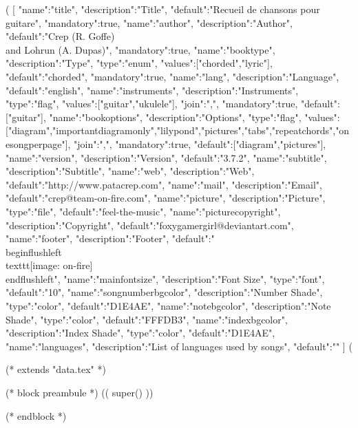 %
%
%

(%
[
{"name":"title", "description":"Title", "default":"Recueil de chansons pour guitare", "mandatory":true},
{"name":"author", "description":"Author", "default":"Crep (R. Goffe) \\and Lohrun (A. Dupas)", "mandatory":true},
{"name":"booktype", "description":"Type", "type":"enum", "values":["chorded","lyric"], "default":"chorded", "mandatory":true},
{"name":"lang", "description":"Language", "default":"english"},
{"name":"instruments", "description":"Instruments", "type":"flag", "values":["guitar","ukulele"], "join":",", "mandatory":true, "default":["guitar"]},
{"name":"bookoptions", "description":"Options", "type":"flag", "values":["diagram","importantdiagramonly","lilypond","pictures","tabs","repeatchords","onesongperpage"], "join":",", "mandatory":true, "default":["diagram","pictures"]},
{"name":"version", "description":"Version", "default":"3.7.2"},
{"name":"subtitle", "description":"Subtitle"},
{"name":"web", "description":"Web", "default":"http://www.patacrep.com"},
{"name":"mail", "description":"Email", "default":"crep@team-on-fire.com"},
{"name":"picture", "description":"Picture", "type":"file", "default":"feel-the-music"},
{"name":"picturecopyright", "description":"Copyright", "default":"foxygamergirl@deviantart.com"},
{"name":"footer", "description":"Footer", "default":"\\begin{flushleft}\\texttt{[image: on-fire]}\\end{flushleft}"},
{"name":"mainfontsize", "description":"Font Size", "type":"font", "default":"10"},
{"name":"songnumberbgcolor", "description":"Number Shade", "type":"color", "default":"D1E4AE"},
{"name":"notebgcolor", "description":"Note Shade", "type":"color", "default":"FFFDB3"},
{"name":"indexbgcolor", "description":"Index Shade", "type":"color", "default":"D1E4AE"},
{"name":"languages", "description":"List of languages used by songs", "default":""}
]
(%

(* extends "data.tex" *)

(* block preambule *)
(( super() ))

\usepackage{venturisold}
\renewcommand{\printchord}[1]{\mdseries\ttfamily\upshape#1}

\usepackage{licence}
(* endblock *)
